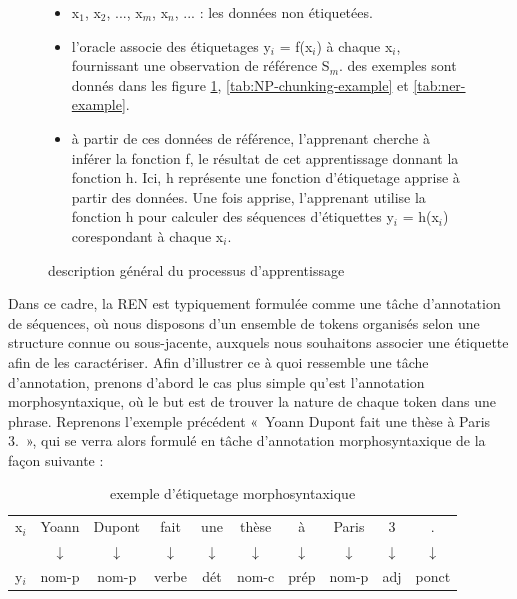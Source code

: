 \documentclass[PhD-Yoann-Dupont.tex]{subfiles}
\begin{document}
\begin{figure}[ht!]
\begin{itemize}
    \item x$_{1}$, x$_{2}$, ..., x$_{m}$, x$_{n}$, ... : les données non étiquetées. %
    \item l’oracle associe des étiquetages y$_{i}$ = f(x$_{i}$) à chaque x$_{i}$, fournissant une observation de référence S$_{m}$. des exemples sont donnés dans les figure \ref{tab:POS-tagging-example}, \ref{tab:NP-chunking-example} et \ref{tab:ner-example}.
    \item à partir de ces données de référence, l’apprenant cherche à inférer la fonction f, le résultat de cet apprentissage donnant la fonction h. Ici, h représente une fonction d’étiquetage apprise à partir des données. Une fois apprise, l’apprenant utilise la fonction h pour calculer des séquences d’étiquettes y$_{i}$ = h(x$_{i}$) corespondant à chaque x$_{i}$.
\end{itemize}
\caption{description général du processus d'apprentissage}
\label{fig:machine-learning-general}
\end{figure}

Dans ce cadre, la REN est typiquement formulée comme une tâche d'annotation de séquences, où nous disposons d'un ensemble de tokens organisés selon une structure connue ou sous-jacente, auxquels nous souhaitons associer une étiquette afin de les caractériser. Afin d'illustrer ce à quoi ressemble une tâche d'annotation, prenons d'abord le cas plus simple qu'est l'annotation morphosyntaxique, où le but est de trouver la nature de chaque token dans une phrase. Reprenons l'exemple précédent «\ Yoann Dupont fait une thèse à Paris 3.\ », qui se verra alors formulé en tâche d'annotation morphosyntaxique de la façon suivante :

\begin{table}[ht!]
\centering
\begin{tabular}{lccccccccc}
x$_{i}$ & Yoann & Dupont & fait & une & thèse & à & Paris & 3 & . \\
        & $\downarrow$ & $\downarrow$ & $\downarrow$ & $\downarrow$ & $\downarrow$ & $\downarrow$ & $\downarrow$ & $\downarrow$ & $\downarrow$ \\
y$_{i}$ & nom-p & nom-p & verbe & dét & nom-c & prép & nom-p & adj & ponct \\
\end{tabular}
\caption{exemple d'étiquetage morphosyntaxique}
\label{tab:POS-tagging-example}
\end{table}
\end{document}

